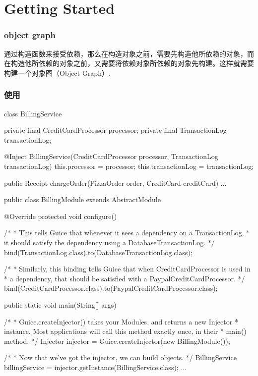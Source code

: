 \section{Getting Started}

\subsubsection{object graph}
通过构造函数来接受依赖，那么在构造对象之前，需要先构造他所依赖的对象，而在构造他所依赖的对象之前，又需要将依赖对象所依赖的对象先构建。这样就需要构建一个对象图（Object Graph）.

\subsubsection{使用}

\begin{Java}[使用@Inject来告诉Guice通过构造函数构造]
class BillingService {
  private final CreditCardProcessor processor;
  private final TransactionLog transactionLog;

  @Inject
  BillingService(CreditCardProcessor processor, 
      TransactionLog transactionLog) {
    this.processor = processor;
    this.transactionLog = transactionLog;
  }

  public Receipt chargeOrder(PizzaOrder order, CreditCard creditCard) {
    ...
  }
}
\end{Java}

\begin{Java}[通过AbstractModule的子类来配置binding]
public class BillingModule extends AbstractModule {
  @Override 
  protected void configure() {

     /*
      * This tells Guice that whenever it sees a dependency on a TransactionLog,
      * it should satisfy the dependency using a DatabaseTransactionLog.
      */
    bind(TransactionLog.class).to(DatabaseTransactionLog.class);

     /*
      * Similarly, this binding tells Guice that when CreditCardProcessor is used in
      * a dependency, that should be satisfied with a PaypalCreditCardProcessor.
      */
    bind(CreditCardProcessor.class).to(PaypalCreditCardProcessor.class);
  }
}
\end{Java}

\begin{Java}
 public static void main(String[] args) {
    /*
     * Guice.createInjector() takes your Modules, and returns a new Injector
     * instance. Most applications will call this method exactly once, in their
     * main() method.
     */
    Injector injector = Guice.createInjector(new BillingModule());

    /*
     * Now that we've got the injector, we can build objects.
     */
    BillingService billingService = injector.getInstance(BillingService.class);
    ...
  }
\end{Java}

